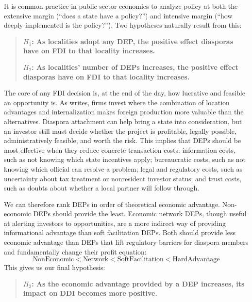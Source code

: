 \documentclass[12pt]{article}
\begin{document}
It is common practice in public sector economics to analyze policy at both the extensive margin (``does a state have a policy?'') and intensive margin (``how deeply implemented is the policy?''). Two hypotheses naturally result from this:

\begin{quote}
\textbf{$H_1$: As localities adopt any DEP, the positive effect diasporas have on FDI to that locality increases.}

\textbf{$H_2$: As localities' number of DEPs increases, the positive effect diasporas have on FDI to that locality increases.}
\end{quote}

The core of any FDI decision is, at the end of the day, how lucrative and feasible an opportunity is. As \citet{dunning_eclectic_2000} writes, firms invest where the combination of location advantages and internalization makes foreign production more valuable than the alternatives. Diaspora attachment can help bring a state into consideration, but an investor still must decide whether the project is profitable, legally possible, administratively feasible, and worth the risk. This implies that DEPs should be most effective when they reduce concrete transaction costs: information costs, such as not knowing which state incentives apply; bureaucratic costs, such as not knowing which official can resolve a problem; legal and regulatory costs, such as uncertainty about tax treatment or nonresident investor status; and trust costs, such as doubts about whether a local partner will follow through.

We can therefore rank DEPs in order of theoretical economic advantage. Non-economic DEPs should provide the least. Economic network DEPs, though useful at alerting investors to opportunities, are a more indirect way of providing informational advantage than soft facilitation DEPs. Both should provide less economic advantage than DEPs that lift regulatory barriers for diaspora members and fundamentally change their profit equation:
\[
\text{NonEconomic} < \text{Network} < \text{SoftFacilitation} < \text{HardAdvantage}
\]
This gives us our final hypothesis:

\begin{quote}
\textbf{$H_3$: As the economic advantage provided by a DEP increases, its impact on DDI becomes more positive.}
\end{quote}
\end{document}
